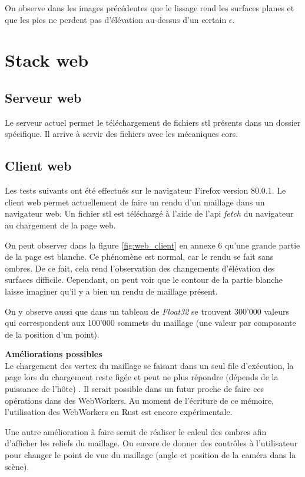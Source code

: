 On observe dans les images précédentes que le lissage rend les surfaces planes et que les pics ne perdent pas d'élévation au-dessus d'un certain $\epsilon$.

\section{Stack web}
\subsection{Serveur web}

Le serveur actuel permet le téléchargement de fichiers \gls{stl} présents dans
un dossier spécifique. Il arrive à servir des fichiers avec les mécaniques \gls{cors}.

\subsection{Client web}
Les tests suivants ont été effectués sur le navigateur Firefox version 80.0.1.
Le client web permet actuellement de faire un rendu d'un maillage dans un
navigateur web. Un fichier \gls{stl} est téléchargé à l'aide de l'api
\textit{fetch} du navigateur au chargement de la page web.

On peut observer dans la figure \ref{fig:web_client} en annexe 6 qu'une grande partie de la page est blanche.
Ce phénomène est normal, car le rendu se fait sans ombres.
De ce fait, cela rend l'observation des changements d'élévation des surfaces difficile.
Cependant, on peut voir que le contour de la partie blanche laisse imaginer qu'il y a bien un rendu de maillage présent.

On y observe aussi que dans un tableau de \textit{Float32} se trouvent 300'000 valeurs qui correspondent aux 100'000 sommets du maillage (une valeur par composante de la position d'un point).

\textbf{Améliorations possibles} \\
Le chargement des vertex du maillage se faisant dans un seul file d'exécution,
la page lors du chargement reste figée et peut ne plus répondre (dépends de la
puissance de l'hôte) .
Il serait possible dans un futur proche de faire ces opérations dans des WebWorkers. Au
moment de l'écriture de ce mémoire, l'utilisation des WebWorkers
en Rust est encore expérimentale.

Une autre amélioration à faire serait de réaliser le calcul des ombres afin d'afficher les reliefs du maillage.
Ou encore de donner des contrôles à l'utilisateur pour changer le point de vue du maillage (angle et position de la caméra dans la scène).

